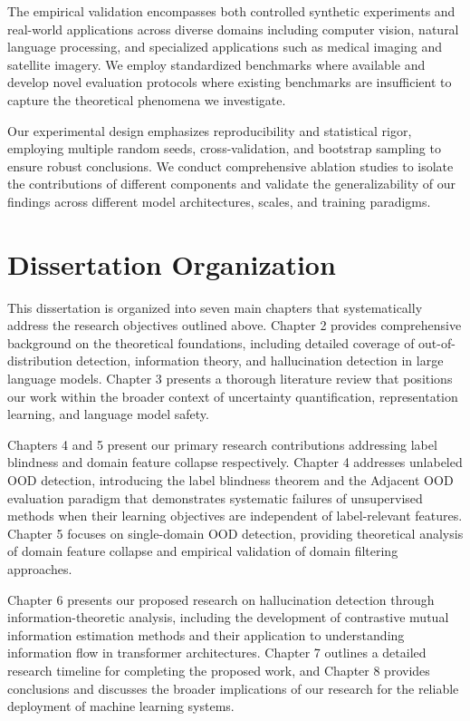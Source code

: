 \documentclass[11pt, oneside]{book}
\theoremstyle{plain}
\theoremstyle{definition}
\theoremstyle{remark}
\begin{document}
The empirical validation encompasses both controlled synthetic experiments and real-world applications across diverse domains including computer vision, natural language processing, and specialized applications such as medical imaging and satellite imagery. We employ standardized benchmarks where available and develop novel evaluation protocols where existing benchmarks are insufficient to capture the theoretical phenomena we investigate.

Our experimental design emphasizes reproducibility and statistical rigor, employing multiple random seeds, cross-validation, and bootstrap sampling to ensure robust conclusions. We conduct comprehensive ablation studies to isolate the contributions of different components and validate the generalizability of our findings across different model architectures, scales, and training paradigms.

\section{Dissertation Organization}

This dissertation is organized into seven main chapters that systematically address the research objectives outlined above. Chapter 2 provides comprehensive background on the theoretical foundations, including detailed coverage of out-of-distribution detection, information theory, and hallucination detection in large language models. Chapter 3 presents a thorough literature review that positions our work within the broader context of uncertainty quantification, representation learning, and language model safety.

Chapters 4 and 5 present our primary research contributions addressing label blindness and domain feature collapse respectively. Chapter 4 addresses unlabeled OOD detection, introducing the label blindness theorem and the Adjacent OOD evaluation paradigm that demonstrates systematic failures of unsupervised methods when their learning objectives are independent of label-relevant features. Chapter 5 focuses on single-domain OOD detection, providing theoretical analysis of domain feature collapse and empirical validation of domain filtering approaches.

Chapter 6 presents our proposed research on hallucination detection through information-theoretic analysis, including the development of contrastive mutual information estimation methods and their application to understanding information flow in transformer architectures. Chapter 7 outlines a detailed research timeline for completing the proposed work, and Chapter 8 provides conclusions and discusses the broader implications of our research for the reliable deployment of machine learning systems.
\end{document}
